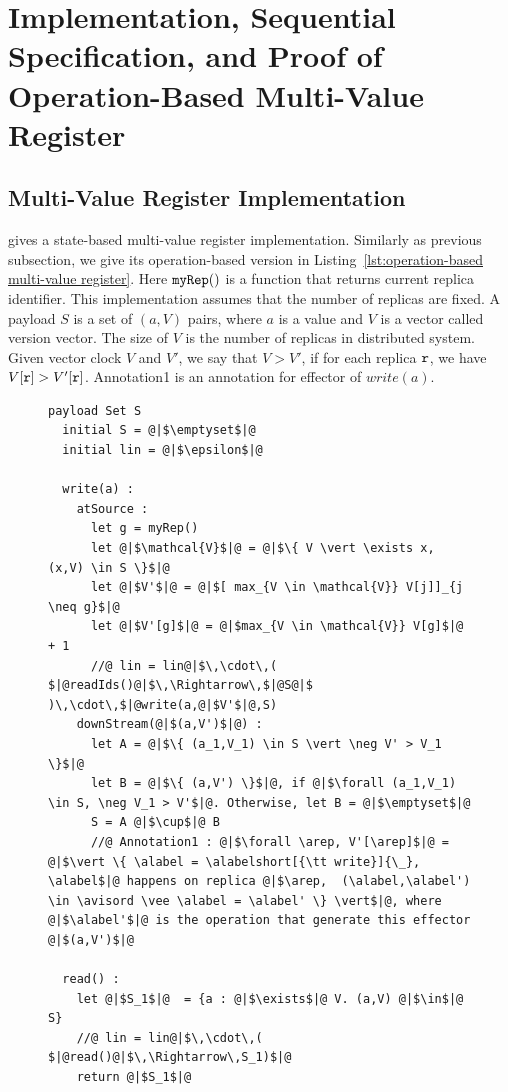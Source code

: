 





\section{Implementation, Sequential Specification, and Proof of Operation-Based Multi-Value Register}
\label{sec:implementation, sequential specification, and proof of opeation-based multi-value register}


\subsection{Multi-Value Register Implementation}
\label{subsec:multi-value register implementation}


\cite{ShapiroPBZ11} gives a state-based multi-value register implementation. Similarly as previous subsection, we give its operation-based version in Listing~\ref{lst:operation-based multi-value register}. Here $\alabelshort[{\tt myRep}]{}$ is a function that returns current replica identifier. This implementation assumes that the number of replicas are fixed. A payload $S$ is a set of $(a,V)$ pairs, where $a$ is a value and $V$ is a vector called version vector. The size of $V$ is the number of replicas in distributed system. %
Given vector clock $V$ and $V'$, we say that $V > V'$, if for each replica $\arep$, we have $V[\arep] > V'[\arep]$. Annotation1 is an annotation for effector of $write(a)$.


\begin{figure}[t]
\begin{lstlisting}[frame=top,caption={Pseudo-code of operation-based multi-value register},
captionpos=b,label={lst:operation-based multi-value register}]
  payload Set S
  initial S = @|$\emptyset$|@
  initial lin = @|$\epsilon$|@

  write(a) :
    atSource :
      let g = myRep()
      let @|$\mathcal{V}$|@ = @|$\{ V \vert \exists x, (x,V) \in S \}$|@
      let @|$V'$|@ = @|$[ max_{V \in \mathcal{V}} V[j]]_{j \neq g}$|@
      let @|$V'[g]$|@ = @|$max_{V \in \mathcal{V}} V[g]$|@ + 1
      //@ lin = lin@|$\,\cdot\,( $|@readIds()@|$\,\Rightarrow\,$|@S@|$ )\,\cdot\,$|@write(a,@|$V'$|@,S)
    downStream(@|$(a,V')$|@) :
      let A = @|$\{ (a_1,V_1) \in S \vert \neg V' > V_1 \}$|@
      let B = @|$\{ (a,V') \}$|@, if @|$\forall (a_1,V_1) \in S, \neg V_1 > V'$|@. Otherwise, let B = @|$\emptyset$|@
      S = A @|$\cup$|@ B
      //@ Annotation1 : @|$\forall \arep, V'[\arep]$|@ = @|$\vert \{ \alabel = \alabelshort[{\tt write}]{\_}, \alabel$|@ happens on replica @|$\arep,  (\alabel,\alabel') \in \avisord \vee \alabel = \alabel' \} \vert$|@, where @|$\alabel'$|@ is the operation that generate this effector @|$(a,V')$|@

  read() :
    let @|$S_1$|@  = {a : @|$\exists$|@ V. (a,V) @|$\in$|@ S}
    //@ lin = lin@|$\,\cdot\,( $|@read()@|$\,\Rightarrow\,S_1)$|@
    return @|$S_1$|@
\end{lstlisting}
\end{figure}

